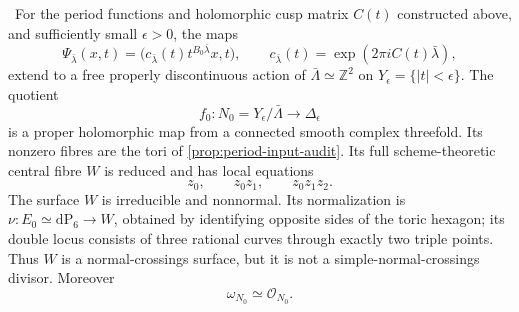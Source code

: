\begin{theorem}
\label{thm:candidate-cusp-geometry}
\Verified\ For the period functions and holomorphic cusp matrix \(C(t)\)
constructed above, and sufficiently small \(\epsilon>0\), the maps
\[
 \Psi_{\bar\lambda}(x,t)=
 \bigl(c_{\bar\lambda}(t)t^{B_0\bar\lambda}x,t\bigr),
 \qquad
 c_{\bar\lambda}(t)=\exp(2\pi iC(t)\bar\lambda),
\tag{2.5}
\]
extend to a free properly discontinuous action of
\(\bar\Lambda\simeq\mathbb Z^2\) on
\(Y_\epsilon=\{|t|<\epsilon\}\).  The quotient
\[
 f_0:N_0=Y_\epsilon/\bar\Lambda\longrightarrow\Delta_\epsilon
\]
is a proper holomorphic map from a connected smooth complex threefold.
Its nonzero fibres are the tori of \cref{prop:period-input-audit}.  Its full
scheme-theoretic central fibre \(W\) is reduced and has local equations
\[
 z_0,\qquad z_0z_1,\qquad z_0z_1z_2.
\tag{2.6}
\]
The surface \(W\) is irreducible and nonnormal.  Its normalization is
\(\nu:E_0\simeq\mathrm{dP}_6\to W\), obtained by identifying opposite sides
of the toric hexagon; its double locus consists of three rational curves
through exactly two triple points.  Thus \(W\) is a normal-crossings surface,
but it is not a simple-normal-crossings divisor.  Moreover
\[
 \omega_{N_0}\simeq\mathcal O_{N_0}.
\tag{2.6a}
\]
\end{theorem}

